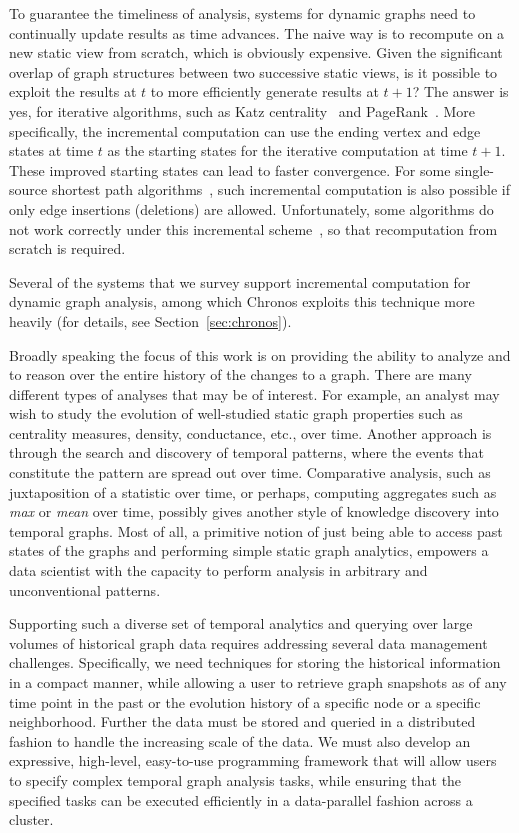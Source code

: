 \documentclass{svjour3}
\begin{document}
 To guarantee the timeliness of analysis, systems for dynamic graphs need to continually update results as time advances. The naive way is to recompute on a new static view from scratch, which is obviously expensive. Given the significant overlap of graph structures between two successive static views, is it possible to exploit the results at $t$ to more efficiently generate results at $t+1$? The answer is yes, for iterative algorithms, such as Katz centrality~\cite{kcentral} and PageRank~\cite{pagerank}. More specifically, the incremental computation can use the ending vertex and edge states at time $t$ as the starting states for the iterative computation at time $t+1$. These improved starting states can lead to faster convergence. For some single-source shortest path algorithms~\cite{sssp}, such incremental computation is also possible if only edge insertions (deletions) are allowed. Unfortunately, some algorithms do not work correctly under this incremental scheme~\cite{dynamicgraph}, so that recomputation from scratch is required.

Several of the systems that we survey support incremental computation for dynamic graph analysis, among which Chronos exploits this technique more heavily (for details, see Section~\ref{sec:chronos}).


Broadly speaking the focus of this work is on providing the ability to analyze and to reason over the entire history of 
the changes to a graph. There are many different types of analyses that may be of interest. 
For example, an analyst may wish to study the evolution of well-studied static graph properties such
as centrality measures, density, conductance, etc., over time. Another approach is through the search and 
discovery of temporal patterns, where the events that constitute the pattern are spread out over time. 
Comparative analysis, such as juxtaposition of a statistic over time, or perhaps, computing 
aggregates such as \textit{max} or \textit{mean} over time, possibly gives another style of knowledge discovery 
into temporal graphs. Most of all, a primitive notion of just being able to access past states of the graphs 
and performing simple static graph analytics, empowers a data scientist with the capacity to 
perform analysis in arbitrary and unconventional patterns.

Supporting such a diverse set of temporal analytics and querying over large volumes of historical graph data 
requires addressing several data management challenges. Specifically, we need techniques for storing
the historical information in a compact manner, while allowing a user to retrieve graph snapshots as of any
time point in the past or the evolution history of a specific node or a specific neighborhood. Further the
data must be stored and queried in a distributed fashion to handle the increasing scale of the data.
We must also develop an expressive, high-level, easy-to-use programming framework that will allow users to 
specify complex temporal graph analysis tasks, while ensuring that the specified tasks can be executed efficiently 
in a data-parallel fashion across a cluster.
\end{document}
